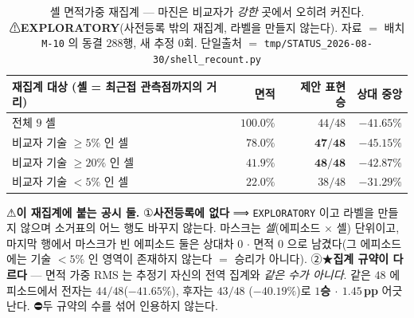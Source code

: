 \documentclass[11pt]{report}
\numberwithin{equation}{chapter}
\numberwithin{figure}{chapter}
\numberwithin{table}{chapter}
\begin{document}
\begin{table}[htbp]
\centering
\caption{셸 면적가중 재집계 --- 마진은 비교자가 \emph{강한} 곳에서 오히려 커진다.
⚠\textbf{EXPLORATORY}(사전등록 밖의 재집계, 라벨을 만들지 않는다). 자료 $=$ 배치
\texttt{M-10} 의 동결 $288$행, 새 추정 $0$회. 단일출처 $=$
\texttt{tmp/STATUS\_2026-08-30/shell\_recount.py}}
\label{tab:shell_recount}
\begin{tabular}{lrrr}
\hline
재집계 대상 (셸 = 최근접 관측점까지의 거리) & 면적 & 제안 표현 승 & 상대 중앙 \\
\hline
전체 $9$ 셸 & $100.0\%$ & $44/48$ & $-41.65\%$ \\
비교자 기술 $\ge 5\%$ 인 셀 & $78.0\%$ & $\mathbf{47/48}$ & $\mathbf{-45.15\%}$ \\
비교자 기술 $\ge 20\%$ 인 셀 & $41.9\%$ & $\mathbf{48/48}$ & $-42.87\%$ \\
비교자 기술 $< 5\%$ 인 셀 & $22.0\%$ & $38/48$ & $-31.29\%$ \\
\hline
\end{tabular}
\end{table}

⚠\textbf{이 재집계에 붙는 공시 둘.}
①\textbf{사전등록에 없다} ⟹ \texttt{EXPLORATORY} 이고 라벨을 만들지 않으며 소거표의
어느 행도 바꾸지 않는다. 마스크는 \emph{셀}(에피소드 $\times$ 셸) 단위이고, 마지막 행에서
마스크가 빈 에피소드 둘은 상대차 $0$ $\cdot$ 면적 $0$ 으로 남겼다(그 에피소드에는
기술 $<5\%$ 인 영역이 존재하지 않는다 $=$ 승리가 아니다).
②★\textbf{집계 규약이 다르다} --- 면적 가중 RMS 는 추정기 자신의 전역 집계와 \emph{같은
수가 아니다}. 같은 $48$ 에피소드에서 전자는 $44/48$($-41.65\%$), 후자는 $43/48$
($-40.19\%$)로 \textbf{$1$승 $\cdot$ $1.45$\,pp} 어긋난다.
⛔두 규약의 수를 섞어 인용하지 않는다.
\end{document}
